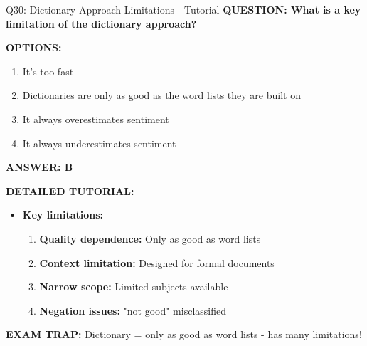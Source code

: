 \documentclass[8pt]{beamer}
\begin{document}
	\begin{frame}{Q30: Dictionary Approach Limitations - Tutorial}
		\fontsize{6.5}{7.5}\selectfont
		\textbf{QUESTION: What is a key limitation of the dictionary approach?}
		
		\vspace{0.1cm}
		\textbf{OPTIONS:}
		\begin{enumerate}
			\item It's too fast
			\item Dictionaries are only as good as the word lists they are built on
			\item It always overestimates sentiment
			\item It always underestimates sentiment
		\end{enumerate}
		
		\vspace{0.1cm}
		\textcolor{myblue}{\textbf{ANSWER: B}}
		
		\vspace{0.1cm}
		\textbf{DETAILED TUTORIAL:}
		\begin{itemize}
			\item \textbf{Key limitations:}
			\begin{enumerate}
				\item \textbf{Quality dependence:} Only as good as word lists
				\item \textbf{Context limitation:} Designed for formal documents
				\item \textbf{Narrow scope:} Limited subjects available
				\item \textbf{Negation issues:} "not good" misclassified
			\end{enumerate}
		\end{itemize}
		
		\textcolor{myred}{\textbf{EXAM TRAP:}} Dictionary = \textcolor{myblue}{only as good as word lists} - has many limitations!
	\end{frame}
	
\end{document}
